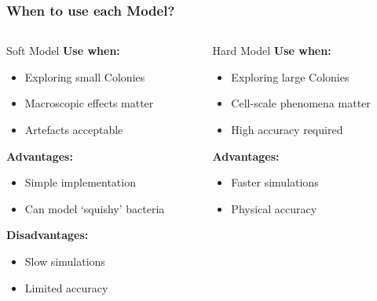 \documentclass[10pt,t]{beamer}
\begin{document}
\begin{frame}
    \frametitle{When to use each Model?}

    \vspace{-0.55cm}

    \begin{columns}
        \begin{column}{0.5\textwidth}
            \begin{alertblock}{Soft Model}
                \textbf{Use when:}
                \begin{itemize}
                    \item Exploring small Colonies
                    \item Macroscopic effects matter
                    \item Artefacts acceptable
                \end{itemize}

                \textbf{Advantages:}
                \begin{itemize}
                    \item Simple implementation
                    \item Can model `squishy' bacteria
                \end{itemize}

                \textbf{Disadvantages:}
                \begin{itemize}
                    \item Slow simulations
                    \item Limited accuracy
                \end{itemize}
            \end{alertblock}
        \end{column}
        \begin{column}{0.5\textwidth}
            \begin{exampleblock}{Hard Model }
                \textbf{Use when:}
                \begin{itemize}
                    \item Exploring large Colonies
                    \item Cell-scale phenomena matter
                    \item High accuracy required
                \end{itemize}

                \textbf{Advantages:}
                \begin{itemize}
                    \item Faster simulations
                    \item Physical accuracy
                \end{itemize}


\end{exampleblock}
\end{column}
\end{columns}
\end{frame}
\end{document}
